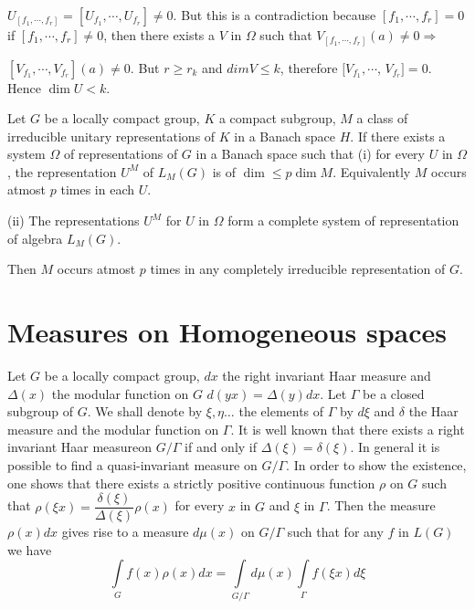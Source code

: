 $U_{[f_1,\cdots,f_r]}=[U_{f_1},\cdots, U_{f_r}]\neq 0$. But this is a
contradiction because $[f_1,\cdots,f_r]=0$ if $[f_1,\cdots,f_r]\neq
0$, then there exists a $V$ in $\Omega$ such that
$V_{[f_1,\cdots,f_r]}(a)\neq 0 \Rightarrow$  
                                 
$[V_{f_1},\cdots, V_{f_r}](a)\neq 0$. But $r \ge r_k$ and $dim V\le
k$, therefore $[V_{f_1},\cdots$, $V_{f_r}]=0$. Hence $\dim U < k$. 
                 
\begin{coro*}
  Let $G$ be a locally compact group, $K$ a compact subgroup, $M$ a
  class of irreducible unitary representations of $K$ in a Banach space
  $H$. If there exists a system $\Omega$ of representations of $G$ in a
  Banach space such that (i) for every $U$ in $\Omega$, the
  representation $U^M$ of $L_M(G)$ is of $\dim \le p \dim
  M$. Equivalently $M$ occurs atmost $p$ times in each $U$.   
\end{coro*}    
 
(ii) The representations $U^M$ for $U$ in $\Omega$ form a complete
system of representation of algebra $L_M(G)$. 
                          
Then $M$ occurs atmost $p$ times in any completely irreducible
representation of $G$.   

\section{Measures on Homogeneous spaces}\label{part2:chap1:sec3}
 
Let $G$ be a locally compact group, $dx$ the right invariant Haar
measure and $\Delta (x)$ the modular function on $G$ \iec  $d(yx)=\Delta
(y)dx$. Let $\Gamma$  be a closed subgroup of $G$. We shall denote by
$\xi, \eta \ldots$ the elements of $\Gamma$ by $d\xi$ and
$\delta$ the Haar measure and the modular function on $\Gamma$. It is
well known that there exists a right  invariant Haar measure\pageoriginale on
$G/\Gamma$ if and only if $\Delta (\xi)=\delta (\xi)$. In general it
is possible to find a quasi-invariant measure on $G/ \Gamma$. In order
to show the existence, one shows that there exists a strictly positive
continuous function $\rho$ on $G$ such that $\rho(\xi
x)=\dfrac{\delta(\xi)}{\Delta(\xi)}\rho (x)$ for every $x$ in $G$ and
$\xi $ in $\Gamma$. Then the measure $\rho (x)dx$ gives rise to  a
measure $d \mu (x)$ on $G/\Gamma$ such that for any $f$ in $L(G)$ we
have  
\begin{equation*}
  \underset{G}\int f(x)\rho (x)dx=\underset{G/\Gamma}\int d \mu (x)
  \underset{\Gamma}\int f(\xi x)d\xi\tag{1}\label{part2:chap1:sec3:eq1} 
\end{equation*}   
                    
